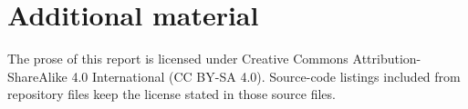 \documentclass[11pt,a4paper]{article}
\theoremstyle{definition}
\theoremstyle{plain}
\begin{document}
\printbibliography[heading=bibintoc,title={References}]

\clearpage
\appendix
\section{Additional material}
\label{sec:additional}

The prose of this report is licensed under Creative Commons
Attribution-ShareAlike 4.0 International (CC BY-SA 4.0). Source-code listings
included from repository files keep the license stated in those source files.


\end{document}
